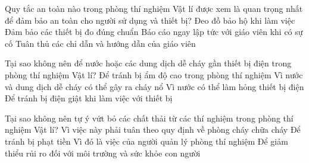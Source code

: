 \begin{ex}
Quy tắc an toàn nào trong phòng thí nghiệm Vật lí được xem là quan trọng nhất để đảm bảo an toàn cho người sử dụng và thiết bị?
\choice
{Đeo đồ bảo hộ khi làm việc}
{Đảm bảo các thiết bị đo đúng chuẩn}
{Báo cáo ngay lập tức với giáo viên khi có sự cố}
{\True Tuân thủ các chỉ dẫn và hướng dẫn của giáo viên}
\end{ex}

\begin{ex}
Tại sao không nên để nước hoặc các dung dịch dễ cháy gần thiết bị điện trong phòng thí nghiệm Vật lí?
\choice
{Để tránh bị ẩm độ cao trong phòng thí nghiệm}
{\True Vì nước và dung dịch dễ cháy có thể gây ra cháy nổ}
{Vì nước có thể làm hỏng thiết bị điện}
{Để tránh bị điện giật khi làm việc với thiết bị}
\end{ex}

\begin{ex}
Tại sao không nên tự ý vứt bỏ các chất thải từ các thí nghiệm trong phòng thí nghiệm Vật lí?
\choice
{Vì việc này phải tuân theo quy định về phòng cháy chữa cháy}
{Để tránh bị phạt tiền}
{Vì đó là việc của người quản lý phòng thí nghiệm}
{\True Để giảm thiểu rủi ro đối với môi trường và sức khỏe con người}
\end{ex}

